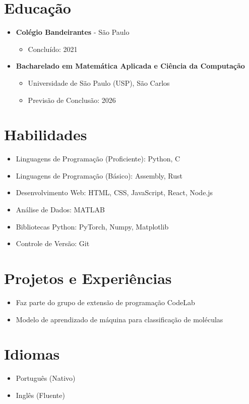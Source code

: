 \documentclass[a4paper,11pt]{article}
\begin{document}
\section*{Educação}
\vspace{-0.3em}
\begin{itemize}[leftmargin=*, itemsep=-2pt]
  \item \textbf{Colégio Bandeirantes} - São Paulo
    \begin{itemize}[itemsep=-1pt]
      \item Concluído: 2021
    \end{itemize}
  \item \textbf{Bacharelado em Matemática Aplicada e Ciência da Computação}
    \begin{itemize}[itemsep=-1pt]
      \item Universidade de São Paulo (USP), São Carlos
      \item Previsão de Conclusão: 2026
    \end{itemize}
\end{itemize}
\vspace{-0.3em}

\section*{Habilidades}
\vspace{-0.3em}
\begin{itemize}[leftmargin=*, itemsep=-2pt]
  \item Linguagens de Programação (Proficiente): Python, C
  \item Linguagens de Programação (Básico): Assembly, Rust
  \item Desenvolvimento Web: HTML, CSS, JavaScript, React, Node.js
  \item Análise de Dados: MATLAB
  \item Bibliotecas Python: PyTorch, Numpy, Matplotlib
  \item Controle de Versão: Git
\end{itemize}
\vspace{-0.3em}

\section*{Projetos e Experiências}
\vspace{-0.3em}
\begin{itemize}[leftmargin=*, itemsep=-2pt]
  \item Faz parte do grupo de extensão de programação CodeLab
  \item Modelo de aprendizado de máquina para classificação de moléculas
\end{itemize}
\vspace{-0.3em}

\section*{Idiomas}
\vspace{-0.3em}
\begin{itemize}[leftmargin=*, itemsep=-2pt]
  \item Português (Nativo)
  \item Inglês (Fluente)
\end{itemize}
\end{document}
